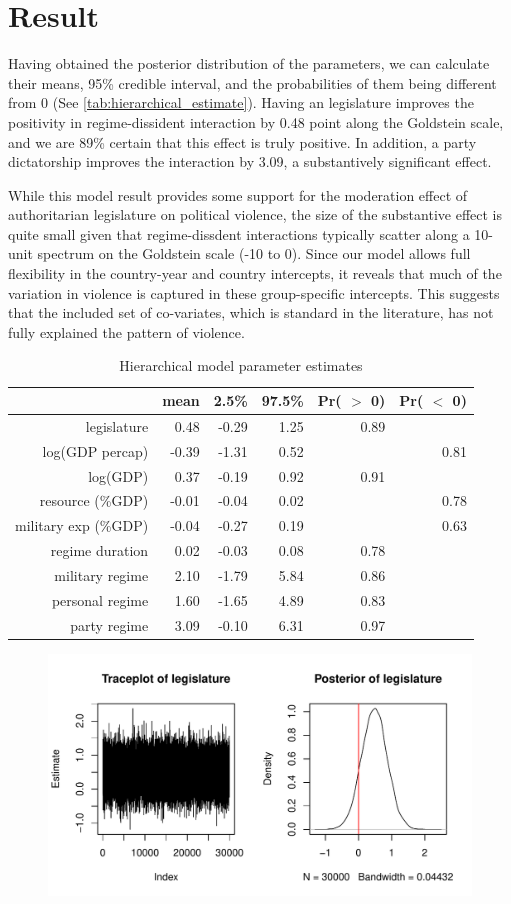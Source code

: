 \section{Result}

Having obtained the posterior distribution of the parameters, we can calculate their means, 95\% credible interval, and the probabilities of them being different from 0 (See \autoref{tab:hierarchical_estimate}). Having an legislature improves the positivity in regime-dissident interaction by 0.48 point along the Goldstein scale, and we are 89\% certain that this effect is truly positive. In addition, a party dictatorship improves the interaction by 3.09, a substantively significant effect.

While this model result provides some support for the moderation effect of authoritarian legislature on political violence, the size of the substantive effect is quite small given that regime-dissdent interactions typically scatter along a 10-unit spectrum on the Goldstein scale (-10 to 0). Since our model allows full flexibility in the country-year and country intercepts, it reveals that much of the variation in violence is captured in these group-specific intercepts. This suggests that the included set of co-variates, which is standard in the literature, has not fully explained the pattern of violence.

\begin{table}[H]
\centering
\begin{tabular}{rrrrrr}
  \hline
 & mean & 2.5\% & 97.5\% & Pr( $>$ 0) & Pr( $<$ 0) \\ 
  \hline
legislature & 0.48 & -0.29 & 1.25 & 0.89 &  \\ 
  log(GDP percap) & -0.39 & -1.31 & 0.52 &  & 0.81 \\ 
  log(GDP) & 0.37 & -0.19 & 0.92 & 0.91 &  \\ 
  resource (\%GDP) & -0.01 & -0.04 & 0.02 &  & 0.78 \\ 
  military exp (\%GDP) & -0.04 & -0.27 & 0.19 &  & 0.63 \\ 
  regime duration & 0.02 & -0.03 & 0.08 & 0.78 &  \\ 
  military regime & 2.10 & -1.79 & 5.84 & 0.86 &  \\ 
  personal regime & 1.60 & -1.65 & 4.89 & 0.83 &  \\ 
  party regime & 3.09 & -0.10 & 6.31 & 0.97 &  \\ 
   \hline
\end{tabular}
\caption{Hierarchical model parameter estimates}
\label{tab:hierarchical_estimate}
\end{table}

\begin{figure}[ht]
    \centering
    \includegraphics[width=\textwidth]{../fig/mcmc_legis}
    \label{fig:mcmc_legis}
\end{figure}
